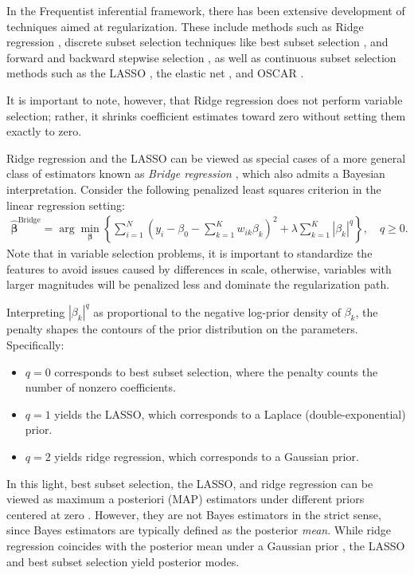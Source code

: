 In the Frequentist inferential framework, there has been extensive development of techniques aimed at regularization. These include methods such as Ridge regression \cite{hoerl1970ridge}, discrete subset selection techniques like best subset selection \cite{furnival1974regressions}, and forward and backward stepwise selection \cite{hastie2009elements}, as well as continuous subset selection methods such as the LASSO \cite{tibshirani1996regression}, the elastic net \cite{zou2005regularization}, and OSCAR \cite{bondell2008simultaneous}. 

It is important to note, however, that Ridge regression does not perform variable selection; rather, it shrinks coefficient estimates toward zero without setting them exactly to zero.

Ridge regression and the LASSO can be viewed as special cases of a more general class of estimators known as \textit{Bridge regression} \cite{fu1998penalized}, which also admits a Bayesian interpretation. Consider the following penalized least squares criterion in the linear regression setting:
\begin{align*}
	\hat{\boldsymbol{\beta}}^{\text{Bridge}} = \arg\min_{\boldsymbol{\beta}} \left\{ \sum_{i=1}^N \left( y_i - \beta_0 - \sum_{k=1}^K w_{ik} \beta_k \right)^2 + \lambda \sum_{k=1}^K |\beta_k|^q \right\}, \quad q \geq 0.
\end{align*}
Note that in variable selection problems, it is important to standardize the features to avoid issues caused by differences in scale, otherwise, variables with larger magnitudes will be penalized less and dominate the regularization path.

Interpreting \( |\beta_k|^q \) as proportional to the negative log-prior density of \( \beta_k \), the penalty shapes the contours of the prior distribution on the parameters. Specifically:
\begin{itemize}
	\item \( q = 0 \) corresponds to best subset selection, where the penalty counts the number of nonzero coefficients.
	\item \( q = 1 \) yields the LASSO, which corresponds to a Laplace (double-exponential) prior.
	\item \( q = 2 \) yields ridge regression, which corresponds to a Gaussian prior.  
	 
\end{itemize}

In this light, best subset selection, the LASSO, and ridge regression can be viewed as maximum a posteriori (MAP) estimators under different priors centered at zero \cite{Park2008}. However, they are not Bayes estimators in the strict sense, since Bayes estimators are typically defined as the posterior \textit{mean}. While ridge regression coincides with the posterior mean under a Gaussian prior \cite{Ishwaran2005}, the LASSO and best subset selection yield posterior modes.

